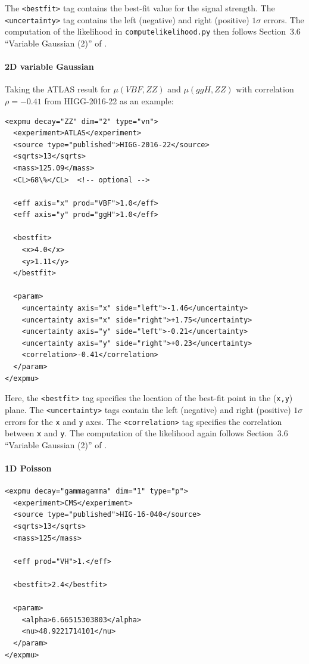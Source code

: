 \documentclass[submission, Phys]{SciPost}
\begin{document}
\noindent
The {\tt <bestfit>} tag contains the best-fit value for the signal strength. 
The {\tt <uncertainty>} tag contains the left (negative) and right (positive) $1\sigma$ errors.
The computation of the likelihood in {\tt computelikelihood.py} then follows Section~3.6 ``Variable Gaussian (2)'' of \cite{Barlow:2004wg}. 


\paragraph{2D variable Gaussian} 

Taking the ATLAS result for $\mu(VBF, ZZ)$ and $\mu(ggH, ZZ)$ with correlation $\rho=-0.41$ from HIGG-2016-22 as an example:

\begin{verbatim}
<expmu decay="ZZ" dim="2" type="vn">
  <experiment>ATLAS</experiment>
  <source type="published">HIGG-2016-22</source>
  <sqrts>13</sqrts>
  <mass>125.09</mass>
  <CL>68\%</CL>  <!-- optional -->

  <eff axis="x" prod="VBF">1.0</eff>
  <eff axis="y" prod="ggH">1.0</eff>

  <bestfit>
    <x>4.0</x>
    <y>1.11</y>
  </bestfit>
 
  <param>
    <uncertainty axis="x" side="left">-1.46</uncertainty>
    <uncertainty axis="x" side="right">+1.75</uncertainty>
    <uncertainty axis="y" side="left">-0.21</uncertainty>
    <uncertainty axis="y" side="right">+0.23</uncertainty>
    <correlation>-0.41</correlation>
  </param>
</expmu>
\end{verbatim}

\noindent
Here, the {\tt <bestfit>} tag specifies the location of the best-fit point in the ({\tt x,y}) plane. 
The {\tt <uncertainty>} tags contain the left (negative) and right (positive) $1\sigma$ errors for the {\tt x} and {\tt y} axes. 
The {\tt <correlation>} tag specifies the correlation between {\tt x} and {\tt y}. 
The computation of the likelihood again follows Section~3.6 ``Variable Gaussian (2)'' of \cite{Barlow:2004wg}. 

\paragraph{1D Poisson} 

\begin{verbatim}
<expmu decay="gammagamma" dim="1" type="p">
  <experiment>CMS</experiment>
  <source type="published">HIG-16-040</source>
  <sqrts>13</sqrts>
  <mass>125</mass>

  <eff prod="VH">1.</eff>

  <bestfit>2.4</bestfit>

  <param>
    <alpha>6.66515303803</alpha>
    <nu>48.9221714101</nu>
  </param>
</expmu>
\end{verbatim}
\end{document}
